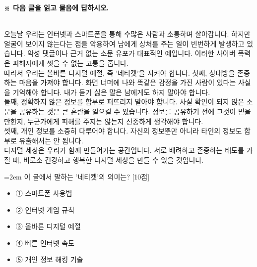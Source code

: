 \documentclass[12pt,a4paper]{article}
\newcommand{\qnum}[1]{%
  \tikz[baseline=(num.base)]{%
    \node[circle, fill=numCircle, text=white, inner sep=0pt,
          minimum size=18pt, font=\small\bfseries] (num) {#1};%
  }%
}
\newcommand{\pts}[1]{%
  \hfill\textcolor{ptsBadge}{[#1점]}%
}
\begin{document}
\vspace{4mm}
{\small\textbf{※ 다음 글을 읽고 물음에 답하시오.}}
\vspace{2mm}
\begin{tcolorbox}[passage]
[지문] \\{}
오늘날 우리는 인터넷과 스마트폰을 통해 수많은 사람과 소통하며 살아갑니다. 하지만 얼굴이 보이지 않는다는 점을 악용하여 남에게 상처를 주는 일이 빈번하게 발생하고 있습니다. 악성 댓글이나 근거 없는 소문 유포가 대표적인 예입니다. 이러한 사이버 폭력은 피해자에게 씻을 수 없는 고통을 줍니다. \\{}
따라서 우리는 올바른 디지털 예절, 즉 '네티켓'을 지켜야 합니다. 첫째, 상대방을 존중하는 마음을 가져야 합니다. 화면 너머에 나와 똑같은 감정을 가진 사람이 있다는 사실을 기억해야 합니다. 내가 듣기 싫은 말은 남에게도 하지 말아야 합니다. \\{}
둘째, 정확하지 않은 정보를 함부로 퍼뜨리지 말아야 합니다. 사실 확인이 되지 않은 소문을 공유하는 것은 큰 혼란을 일으킬 수 있습니다. 정보를 공유하기 전에 그것이 믿을 만한지, 누군가에게 피해를 주지는 않는지 신중하게 생각해야 합니다. \\{}
셋째, 개인 정보를 소중히 다루어야 합니다. 자신의 정보뿐만 아니라 타인의 정보도 함부로 유출해서는 안 됩니다. \\{}
디지털 세상은 우리가 함께 만들어가는 공간입니다. 서로 배려하고 존중하는 태도를 가질 때, 비로소 건강하고 행복한 디지털 세상을 만들 수 있을 것입니다.
\end{tcolorbox}
\vspace{3mm}
\begin{minipage}{\columnwidth}
{\hangindent=2em
\qnum{25}\enspace 이 글에서 말하는 '네티켓'의 의미는? \pts{10}
\par}

\vspace{3mm}
\begin{itemize}[leftmargin=2.5em, labelsep=0.3em, label={}, itemsep=4pt, parsep=1pt, topsep=0pt]
  \item ① 스마트폰 사용법
  \item ② 인터넷 게임 규칙
  \item ③ 올바른 디지털 예절
  \item ④ 빠른 인터넷 속도
  \item ⑤ 개인 정보 해킹 기술
\end{itemize}
\end{minipage}
\vspace{4mm}
\end{document}
